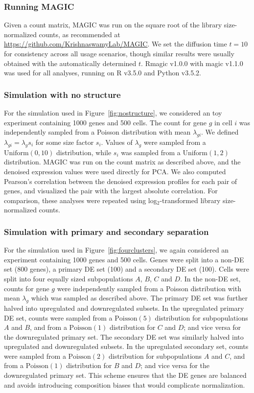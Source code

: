 \documentclass[10pt,letterpaper]{article}
\begin{document}
\subsubsection*{Running MAGIC}
Given a count matrix, MAGIC was run on the square root of the library size-normalized counts, as recommended at \url{https://github.com/KrishnaswamyLab/MAGIC}.
We set the diffusion time $t=10$ for consistency across all usage scenarios, though similar results were usually obtained with the automatically determined $t$.
Rmagic v1.0.0 with magic v1.1.0 was used for all analyses, running on R v3.5.0 and Python v3.5.2.

\subsubsection*{Simulation with no structure}
For the simulation used in Figure~\ref{fig:nostructure}, we considered an toy experiment containing 1000 genes and 500 cells.
The count for gene $g$ in cell $i$ was independently sampled from a Poisson distribution with mean $\lambda_{gi}$.
We defined $\lambda_{gi}= \lambda_g s_i$ for some size factor $s_i$.
Values of $\lambda_g$ were sampled from a $\mbox{Uniform}(0, 10)$ distribution, while $s_i$ was sampled from a $\mbox{Uniform}(1, 2)$ distribution.       
MAGIC was run on the count matrix as described above, and the denoised expression values were used directly for PCA.
We also computed Pearson's correlation between the denoised expression profiles for each pair of genes, and visualized the pair with the largest absolute correlation.
For comparison, these analyses were repeated using log$_2$-transformed library size-normalized counts.

\subsubsection*{Simulation with primary and secondary separation}
For the simulation used in Figure~\ref{fig:fourclusters}, we again considered an experiment containing 1000 genes and 500 cells.
Genes were split into a non-DE set (800 genes), a primary DE set (100) and a secondary DE set (100).
Cells were split into four equally sized subpopulations $A$, $B$, $C$ and $D$.
In the non-DE set, counts for gene $g$ were independently sampled from a Poisson distribution with mean $\lambda_{g}$ which was sampled as described above.
The primary DE set was further halved into upregulated and downregulated subsets.
In the upregulated primary DE set, counts were sampled from a $\mbox{Poisson}(5)$ distribution for subpopulations $A$ and $B$, 
and from a $\mbox{Poisson}(1)$ distribution for $C$ and $D$; and vice versa for the downregulated primary set.
The secondary DE set was similarly halved into upregulated and downregulated subsets.
In the upregulated secondary set, counts were sampled from a $\mbox{Poisson}(2)$ distribution for subpopulations $A$ and $C$, 
and from a $\mbox{Poisson}(1)$ distribution for $B$ and $D$; and vice versa for the downregulated primary set.
This scheme ensures that the DE genes are balanced and avoids introducing composition biases \cite{robinson2010scaling} that would complicate normalization.
\end{document}
